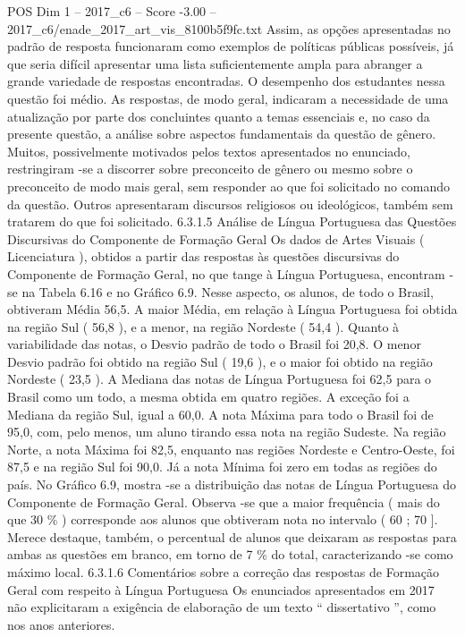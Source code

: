 \begin{textsample}{POS Dim 1 – 2017\_c6 – Score -3.00 – 2017\_c6/enade\_2017\_art\_vis\_8100b5f9fc.txt}
Assim, as opções apresentadas no padrão de resposta funcionaram como exemplos de políticas públicas possíveis, já que seria difícil apresentar uma lista suficientemente ampla para abranger a grande variedade de respostas encontradas.
O desempenho dos estudantes nessa questão foi médio.
As respostas, de modo geral, indicaram a necessidade de uma atualização por parte dos concluintes quanto a temas essenciais e, no caso da presente questão, a análise sobre aspectos fundamentais da questão de gênero.
Muitos, possivelmente motivados pelos textos apresentados no enunciado, restringiram -se a discorrer sobre preconceito de gênero ou mesmo sobre o preconceito de modo mais geral, sem responder ao que foi solicitado no comando da questão.
Outros apresentaram discursos religiosos ou ideológicos, também sem tratarem do que foi solicitado. 6.3.1.5 Análise de Língua Portuguesa das Questões Discursivas do Componente de Formação Geral Os dados de Artes Visuais ( Licenciatura ), obtidos a partir das respostas às questões discursivas do Componente de Formação Geral, no que tange à Língua Portuguesa, encontram -se na Tabela 6.16 e no Gráfico 6.9.
Nesse aspecto, os alunos, de todo o Brasil, obtiveram Média 56,5.
A maior Média, em relação à Língua Portuguesa foi obtida na região Sul ( 56,8 ), e a menor, na região Nordeste ( 54,4 ).
Quanto à variabilidade das notas, o Desvio padrão de todo o Brasil foi 20,8.
O menor Desvio padrão foi obtido na região Sul ( 19,6 ), e o maior foi obtido na região Nordeste ( 23,5 ).
A Mediana das notas de Língua Portuguesa foi 62,5 para o Brasil como um todo, a mesma obtida em quatro regiões.
A exceção foi a Mediana da região Sul, igual a 60,0.
A nota Máxima para todo o Brasil foi de 95,0, com, pelo menos, um aluno tirando essa nota na região Sudeste.
Na região Norte, a nota Máxima foi 82,5, enquanto nas regiões Nordeste e Centro-Oeste, foi 87,5 e na região Sul foi 90,0.
Já a nota Mínima foi zero em todas as regiões do país.
No Gráfico 6.9, mostra -se a distribuição das notas de Língua Portuguesa do Componente de Formação Geral.
Observa -se que a maior frequência ( mais do que 30 \% ) corresponde aos alunos que obtiveram nota no intervalo ( 60 ; 70 ].
Merece destaque, também, o percentual de alunos que deixaram as respostas para ambas as questões em branco, em torno de 7 \% do total, caracterizando -se como máximo local. 6.3.1.6 Comentários sobre a correção das respostas de Formação Geral com respeito à Língua Portuguesa Os enunciados apresentados em 2017 não explicitaram a exigência de elaboração de um texto “ dissertativo ”, como nos anos anteriores.

\end{textsample}
